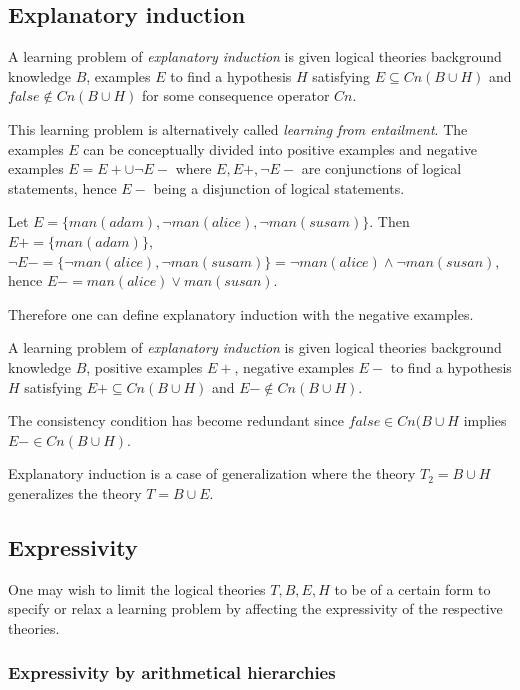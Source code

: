 \subsection{Explanatory induction\cite{yamamoto2012inverse}}
\begin{defn}\cite{flach1996rationality} A learning problem of \emph{explanatory induction} is given logical theories background knowledge $B$, examples $E$ to find a hypothesis $H$ satisfying $E \subseteq Cn(B \cup H)$ and $false \not\in Cn(B \cup H)$ for some consequence operator $Cn$.
\end{defn}

This learning problem is alternatively called \emph{learning from entailment}\cite{muggleton1995inverse}\cite{de1997logical}. The examples $E$ can be conceptually divided into positive examples and negative examples $E=E+ \cup \neg E-$ where $E, E+, \neg E-$ are conjunctions of logical statements, hence $E-$ being a disjunction of logical statements.

\begin{exmp}
Let $E=\{man(adam), \neg man(alice), \neg man(susam)\}$. Then $E+=\{man(adam)\}$,
$\neg E- = \{\neg man(alice), \neg man(susam)\}=\neg man(alice) \land \neg man(susan)$, hence
$E- = man(alice) \lor man(susan)$.
\end{exmp}

Therefore one can define explanatory induction with the negative examples.
\begin{defn}A learning problem of \emph{explanatory induction} is given logical theories background knowledge $B$, positive examples $E+$, negative examples $E-$ to find a hypothesis $H$ satisfying
$E+ \subseteq Cn(B \cup H)$ and $E- \not\in Cn(B \cup H)$.
\end{defn}
The consistency condition has become redundant since $false \in Cn(B \cup H$ implies $E- \in Cn(B \cup H)$.

Explanatory induction is a case of generalization where the theory $T_2=B \cup H$ generalizes the theory $T = B \cup E$.

\subsection{Expressivity}
One may wish to limit the logical theories $T, B, E, H$ to be of a certain form to specify or relax a learning problem by affecting the expressivity of the respective theories.

\subsubsection{Expressivity by arithmetical hierarchies}
